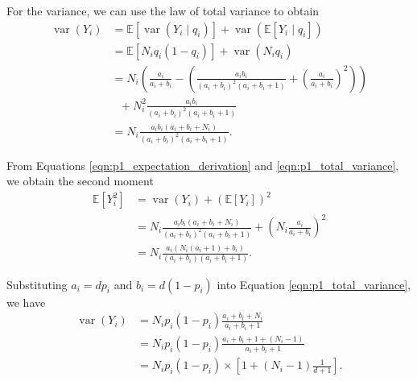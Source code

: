 \documentclass[letterpaper,11pt]{article}
\begin{document}
\begin{enumerate}
\begin{enumerate}
\begin{description}
      For the variance, we can use the law of total variance to obtain
      \begin{align}
        \operatorname{var}\left(
        Y_i
        \right)
        &= \mathbb{E}\left[
          \operatorname{var}\left(Y_i \mid q_i\right)
          \right] +
          \operatorname{var}\left(\mathbb{E}\left[Y_i \mid q_i\right]\right)
          \nonumber\\
        &= \mathbb{E}\left[N_i q_i\left(1 - q_i\right)\right]
          + \operatorname{var}\left(N_iq_i\right) \nonumber\\
        &= N_i\left(
          \frac{a_i}{a_i + b_i}
          - \left(
          \frac{a_ib_i}{\left(a_i + b_i\right)^2\left(a_i + b_i + 1\right)}
          +  \left(\frac{a_i}{a_i + b_i}\right)^2
          \right)
          \right) \nonumber\\
        &~~~+ N_i^2\frac{a_ib_i}{\left(a_i + b_i\right)^2\left(a_i + b_i + 1\right)}
          \nonumber\\
        &= N_i\frac{a_ib_i\left(a_i+b_i+ N_i\right)}{
          \left(a_i + b_i\right)^2\left(a_i + b_i + 1\right)}.
          \label{eqn:p1_total_variance}
      \end{align}

      From Equations \ref{eqn:p1_expectation_derivation} and
      \ref{eqn:p1_total_variance}, we obtain the second moment
      \begin{align*}
        \mathbb{E}\left[Y_i^2\right]
        &= \operatorname{var}\left(Y_i\right) +
          \left(\mathbb{E}\left[Y_i\right]\right)^2 \\
        &= N_i\frac{a_ib_i\left(a_i+b_i+ N_i\right)}{
          \left(a_i + b_i\right)^2\left(a_i + b_i + 1\right)}
          + \left(N_i\frac{a_i}{a_i + b_i}\right)^2 \\
        &= N_i\frac{a_i\left(N_i\left(a_i + 1\right) + b_i\right)}{
          \left(a_i + b_i\right)\left(a_i + b_i + 1\right)}.
      \end{align*}

      Substituting $a_i = dp_i$ and $b_i = d\left(1-p_i\right)$ into Equation
      \ref{eqn:p1_total_variance}, we have
      \begin{align}
        \operatorname{var}\left(Y_i\right)
        &= N_ip_i\left(1 - p_i\right)\frac{a_i + b_i + N_i}{a_i + b_i + 1}
          \nonumber\\
        &= N_ip_i\left(1 - p_i\right)\frac{a_i + b_i + 1 + \left(N_i - 1\right)}
          {a_i + b_i + 1} \nonumber\\
        &= N_ip_i\left(1 - p_i\right) \times \left[
          1 + \left(N_i - 1\right)\frac{1}{d + 1}\right].
          \label{eqn:p1_variance_substitution}
      \end{align}


\end{description}
\end{enumerate}
\end{enumerate}
\end{document}
